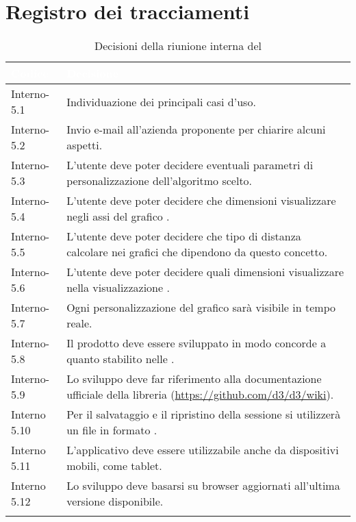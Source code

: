 \section{Registro dei tracciamenti}
{
\renewcommand{\arraystretch}{1.5}
\centering
\begin{longtable}{C{3cm} C{10cm}}
\textcolor{white}{\textbf{Codice}}&
\textcolor{white}{\textbf{Decisione}}\\	
\endhead
		
Interno-5.1 & Individuazione dei principali casi d'uso.\\
Interno-5.2 & Invio e-mail all'azienda proponente per chiarire alcuni aspetti.\\

Interno-5.3 & L'utente deve poter decidere eventuali parametri di personalizzazione dell'algoritmo scelto.\\

Interno-5.4 & L'utente deve poter decidere che dimensioni visualizzare negli assi del grafico .\\

Interno-5.5 & L'utente deve poter decidere che tipo di distanza calcolare nei grafici che dipendono da questo concetto.\\

Interno-5.6 & L'utente deve poter decidere quali dimensioni visualizzare nella visualizzazione .\\

Interno-5.7 & Ogni personalizzazione del grafico sarà visibile in tempo reale.\\

Interno-5.8 & Il prodotto deve essere sviluppato in modo concorde a quanto stabilito nelle \NdPv{}.\\

Interno-5.9 & Lo sviluppo deve far riferimento alla documentazione ufficiale della libreria  (\textcolor{blue}{\url{https://github.com/d3/d3/wiki}}). \\

Interno 5.10 & Per il salvataggio e il ripristino della sessione si utilizzerà un file in formato .\\

Interno 5.11 & L'applicativo deve essere utilizzabile anche da dispositivi mobili, come tablet.\\

Interno 5.12 & Lo sviluppo deve basarsi su browser aggiornati all'ultima versione disponibile.\\

\caption{Decisioni della riunione interna del \Data{}}
		
\end{longtable}
}
